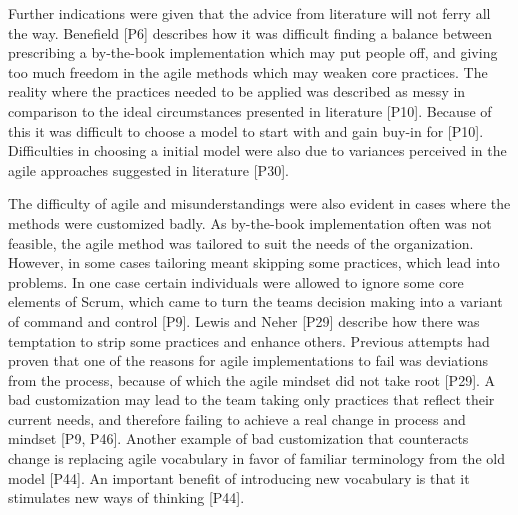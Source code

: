 
Further indications were given that the advice from literature will not ferry
all the way. Benefield [P6] describes how it was difficult finding a balance
between prescribing a by-the-book implementation which may put people off, and
giving too much freedom in the agile methods which may weaken core practices.
The reality where the practices needed to be applied was described as messy in
comparison to the ideal circumstances presented in literature [P10]. Because of
this it was difficult to choose a model to start with and gain buy-in for [P10].
Difficulties in choosing a initial model were also due to variances perceived in
the agile approaches suggested in literature [P30].



The difficulty of agile and misunderstandings were also evident in cases where
the methods were customized badly. As by-the-book implementation often was not
feasible, the agile method was tailored to suit the needs of the organization.
However, in some cases tailoring meant skipping some practices, which lead into
problems. In one case certain individuals were allowed to ignore some core
elements of Scrum, which came to turn the teams decision making into a variant
of command and control [P9].
Lewis and Neher [P29] describe how there was temptation to strip some practices
and enhance others. Previous attempts had proven that one of the reasons for
agile implementations to fail was deviations from the process, because of which
the agile mindset did not take root [P29]. A bad customization may lead to the
team taking only practices that reflect their current needs, and therefore
failing to achieve a real change in process and mindset [P9, P46].
Another example of bad customization that counteracts change is replacing agile
vocabulary in favor of familiar terminology from the old model [P44]. An
important benefit of introducing new vocabulary is that it stimulates new ways
of thinking [P44].


